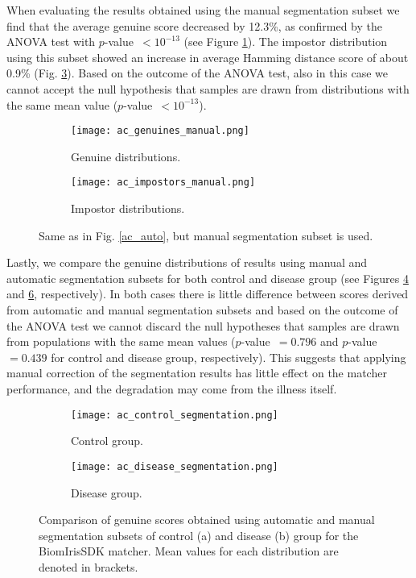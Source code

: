\documentclass[a4paper]{spie}
\begin{document}
When evaluating the results obtained using the manual segmentation subset we find that the average genuine score decreased by 12.3\%, as confirmed by the ANOVA test with $p$-value~$<10^{-13}$ (see Figure \ref{ac_genuines_manual}). The impostor distribution using this subset showed an increase in average Hamming distance score of about 0.9\% (Fig. \ref{ac_impostors_manual}). Based on the outcome of the ANOVA test, also in this case we cannot accept the null hypothesis that samples are drawn from distributions with the same mean value ($p$-value~$<10^{-13}$).

\begin{figure}[!h]
\centering
\begin{subfigure}{0.5\textwidth}
  \centering
  \texttt{[image: ac\_genuines\_manual.png]}
  \caption{Genuine distributions.}
  \label{ac_genuines_manual}
\end{subfigure}%
\begin{subfigure}{0.5\textwidth}
  \centering
  \texttt{[image: ac\_impostors\_manual.png]}
  \caption{Impostor distributions.}
  \label{ac_impostors_manual}
\end{subfigure}
\vskip0.2cm
\caption{Same as in Fig. \ref{ac_auto}, but manual segmentation subset is used.}
\end{figure}

Lastly, we compare the genuine distributions of results using manual and automatic segmentation subsets for both control and disease group (see Figures \ref{ac_control_segmentation} and \ref{ac_disease_segmentation}, respectively). In both cases there is little difference between scores derived from automatic and manual segmentation subsets and based on the outcome of the ANOVA test we cannot discard the null hypotheses that samples are drawn from populations with the same mean values ($p$-value~$=0.796$ and $p$-value~$=0.439$ for control and disease group, respectively). This suggests that applying manual correction of the segmentation results has little effect on the matcher performance, and the degradation may come from the illness itself.


\begin{figure}[!h]
\centering
\begin{subfigure}{0.5\textwidth}
  \centering
  \texttt{[image: ac\_control\_segmentation.png]}
  \caption{Control group.}
  \label{ac_control_segmentation}
\end{subfigure}%
\begin{subfigure}{0.5\textwidth}
  \centering
  \texttt{[image: ac\_disease\_segmentation.png]}
  \caption{Disease group.}
  \label{ac_disease_segmentation}
\end{subfigure}
\vskip0.2cm
\caption{Comparison of genuine scores obtained using automatic and manual segmentation subsets of control (a) and disease (b) group for the BiomIrisSDK matcher. Mean values for each distribution are denoted in brackets.}
\end{figure}
\end{document}
